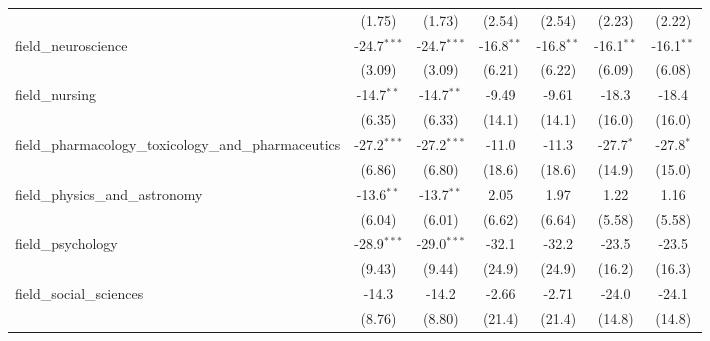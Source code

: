 \begin{tabular}{lcccccc}
                                                               & (1.75)         & (1.73)        & (2.54)         & (2.54)         & (2.23)        & (2.22)\\   
   field\_neuroscience                                         & -24.7$^{***}$  & -24.7$^{***}$ & -16.8$^{**}$   & -16.8$^{**}$   & -16.1$^{**}$  & -16.1$^{**}$\\   
                                                               & (3.09)         & (3.09)        & (6.21)         & (6.22)         & (6.09)        & (6.08)\\   
   field\_nursing                                              & -14.7$^{**}$   & -14.7$^{**}$  & -9.49          & -9.61          & -18.3         & -18.4\\   
                                                               & (6.35)         & (6.33)        & (14.1)         & (14.1)         & (16.0)        & (16.0)\\   
   field\_pharmacology\_toxicology\_and\_pharmaceutics         & -27.2$^{***}$  & -27.2$^{***}$ & -11.0          & -11.3          & -27.7$^{*}$   & -27.8$^{*}$\\   
                                                               & (6.86)         & (6.80)        & (18.6)         & (18.6)         & (14.9)        & (15.0)\\   
   field\_physics\_and\_astronomy                              & -13.6$^{**}$   & -13.7$^{**}$  & 2.05           & 1.97           & 1.22          & 1.16\\   
                                                               & (6.04)         & (6.01)        & (6.62)         & (6.64)         & (5.58)        & (5.58)\\   
   field\_psychology                                           & -28.9$^{***}$  & -29.0$^{***}$ & -32.1          & -32.2          & -23.5         & -23.5\\   
                                                               & (9.43)         & (9.44)        & (24.9)         & (24.9)         & (16.2)        & (16.3)\\   
   field\_social\_sciences                                     & -14.3          & -14.2         & -2.66          & -2.71          & -24.0         & -24.1\\   
                                                               & (8.76)         & (8.80)        & (21.4)         & (21.4)         & (14.8)        & (14.8)\\   

\end{tabular}
